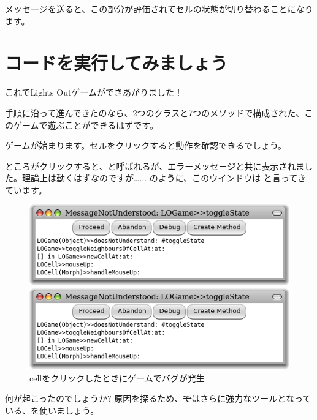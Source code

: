 \documentclass[a4paper,10pt,twoside]{book}
\begin{document}

\noindent
{}メッセージを送ると、この部分が評価されてセルの状態が切り替わることになります。

\section{コードを実行してみましょう}

これでLights Outゲームができあがりました！

手順に沿って進んできたのなら、2つのクラスと7つのメソッドで構成された、このゲームで遊ぶことができるはずです。


ゲームが始まります。セルをクリックすると動作を確認できるでしょう。

ところがクリックすると、と呼ばれるが、エラーメッセージと共に表示されました。理論上は動くはずなのですが\ldots{}... のように、このウインドウは と言ってきています。

\begin{figure}[ht]
\ifluluelse
	{\centerline{\includegraphics[width=\textwidth]{Error}}}
	{\centerline{\includegraphics[scale=0.7]{Error}}}
\caption{cellをクリックしたときにゲームでバグが発生
}
\end{figure}

\noindent
何が起こったのでしょうか? 原因を探るため、\st ではさらに強力なツールとなっている、を使いましょう。
\end{document}
